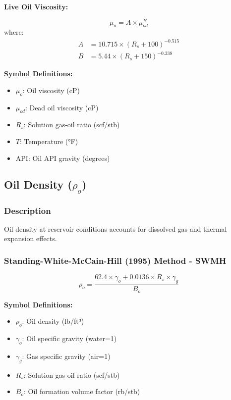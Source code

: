 \documentclass[11pt,a4paper]{article}
\newcommand{\symitem}[2]{\item \textbf{#1}: #2}
\begin{document}
\textbf{Live Oil Viscosity:}
\begin{tcolorbox}[colback=formulabox,colframe=black!75]
\begin{equation}
\mu_o = A \times \mu_{od}^B
\end{equation}
where:
\begin{align}
A &= 10.715 \times (R_s + 100)^{-0.515} \\
B &= 5.44 \times (R_s + 150)^{-0.338}
\end{align}
\end{tcolorbox}

\textbf{Symbol Definitions:}
\begin{itemize}[leftmargin=2cm]
\symitem{$\mu_o$}{Oil viscosity (cP)}
\symitem{$\mu_{od}$}{Dead oil viscosity (cP)}
\symitem{$R_s$}{Solution gas-oil ratio (scf/stb)}
\symitem{$T$}{Temperature (°F)}
\symitem{$\text{API}$}{Oil API gravity (degrees)}
\end{itemize}

\subsection{Oil Density ($\rho_o$)}

\subsubsection{Description}
Oil density at reservoir conditions accounts for dissolved gas and thermal expansion effects.

\subsubsection{Standing-White-McCain-Hill (1995) Method - SWMH}

\begin{tcolorbox}[colback=formulabox,colframe=black!75]
\begin{equation}
\rho_o = \frac{62.4 \times \gamma_o + 0.0136 \times R_s \times \gamma_g}{B_o}
\end{equation}
\end{tcolorbox}

\textbf{Symbol Definitions:}
\begin{itemize}[leftmargin=2cm]
\symitem{$\rho_o$}{Oil density (lb/ft³)}
\symitem{$\gamma_o$}{Oil specific gravity (water=1)}
\symitem{$\gamma_g$}{Gas specific gravity (air=1)}
\symitem{$R_s$}{Solution gas-oil ratio (scf/stb)}
\symitem{$B_o$}{Oil formation volume factor (rb/stb)}
\end{itemize}
\end{document}
